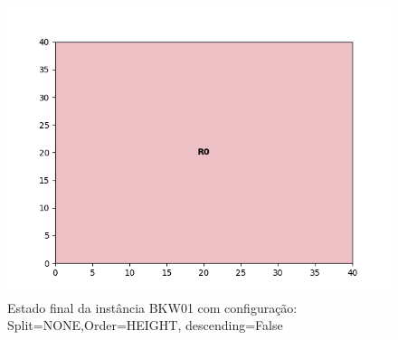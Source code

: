 \begin{figure}[H]
    \centering
    \caption[]{Estado final da instância BKW01 com configuração: Split=NONE,Order=HEIGHT, descending=False}
    \label{fig:bkw01-none-height-false}
    \includegraphics[scale=0.5]{output/figures/bkw/bkw01/none/height/false/00}
\end{figure}